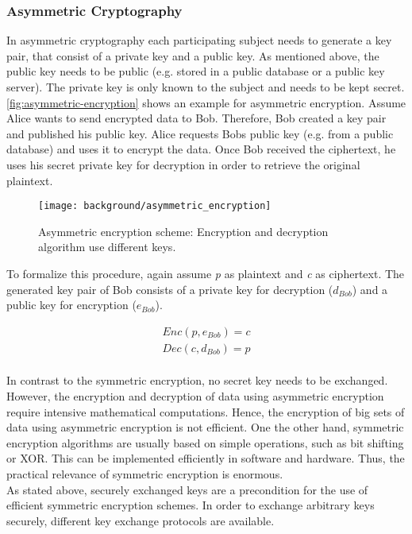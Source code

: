 \subsubsection{Asymmetric Cryptography}

In asymmetric cryptography each participating subject needs to generate a key pair, that consist of a private key and a public key. As mentioned above, the public key needs to be public (e.g. stored in a public database or a public key server). The private key is only known to the subject and needs to be kept secret.
\autoref{fig:asymmetric-encryption} shows an example for asymmetric encryption. Assume Alice wants to send encrypted data to Bob. Therefore, Bob created a key pair and published his public key. Alice requests Bobs public key (e.g. from a public database) and uses it to encrypt the data. Once Bob received the ciphertext, he uses his secret private key for decryption in order to retrieve the original  plaintext.

\begin{figure}[htpb]
  \centering
  \texttt{[image: background/asymmetric\_encryption]}
  \caption[Asymmetric encryption scheme]{Asymmetric encryption scheme: Encryption and decryption algorithm use different keys.} \label{fig:asymmetric-encryption}
\end{figure}

To formalize this procedure, again assume \textit{p} as plaintext and \textit{c} as ciphertext. The generated key pair of Bob consists of a private key for decryption ($d_{Bob}$) and a public key for encryption ($e_{Bob}$).

\begin{align*}
Enc(p, e_{Bob}) = c\\
Dec(c, d_{Bob}) = p
\end{align*}
\\
In contrast to the symmetric encryption, no secret key needs to be exchanged. However, the encryption and decryption of data using asymmetric encryption require intensive mathematical computations. Hence, the encryption of big sets of data using asymmetric encryption is not efficient.
One the other hand, symmetric encryption algorithms are usually based on simple operations, such as bit shifting or XOR. This can be implemented efficiently in software and hardware. Thus, the practical relevance of symmetric encryption is enormous.~\parencite{ITSicherheit}
\\
As stated above, securely exchanged keys are a precondition for the use of efficient symmetric encryption schemes. In order to exchange arbitrary keys securely, different key exchange protocols are available.


